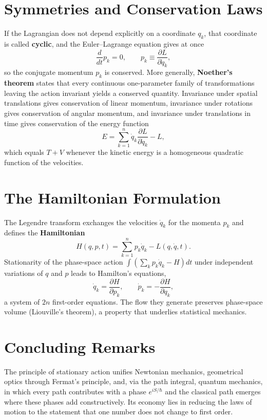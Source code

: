 \section{Symmetries and Conservation Laws}
If the Lagrangian does not depend explicitly on a coordinate $q_k$, that coordinate is called \textbf{cyclic}, and the Euler--Lagrange equation gives at once
\begin{equation}
    \frac{d}{dt} p_k = 0, \qquad p_k \equiv \frac{\partial L}{\partial \dot{q}_k},
\end{equation}
so the conjugate momentum $p_k$ is conserved. More generally, \textbf{Noether's theorem} states that every continuous one-parameter family of transformations leaving the action invariant yields a conserved quantity. Invariance under spatial translations gives conservation of linear momentum, invariance under rotations gives conservation of angular momentum, and invariance under translations in time gives conservation of the energy function
\begin{equation}
    E = \sum_{k=1}^{n} \dot{q}_k \frac{\partial L}{\partial \dot{q}_k} - L ,
\end{equation}
which equals $T + V$ whenever the kinetic energy is a homogeneous quadratic function of the velocities.

\section{The Hamiltonian Formulation}
The Legendre transform exchanges the velocities $\dot{q}_k$ for the momenta $p_k$ and defines the \textbf{Hamiltonian}
\begin{equation}
    H(q, p, t) = \sum_{k=1}^{n} p_k \dot{q}_k - L(q, \dot{q}, t).
\end{equation}
Stationarity of the phase-space action $\int \left( \sum_k p_k \dot{q}_k - H \right) dt$ under independent variations of $q$ and $p$ leads to Hamilton's equations,
\begin{equation}
    \dot{q}_k = \frac{\partial H}{\partial p_k}, \qquad \dot{p}_k = -\frac{\partial H}{\partial q_k},
\end{equation}
a system of $2n$ first-order equations. The flow they generate preserves phase-space volume (Liouville's theorem), a property that underlies statistical mechanics.

\section{Concluding Remarks}
The principle of stationary action unifies Newtonian mechanics, geometrical optics through Fermat's principle, and, via the path integral, quantum mechanics, in which every path contributes with a phase $e^{i S / \hbar}$ and the classical path emerges where these phases add constructively. Its economy lies in reducing the laws of motion to the statement that one number does not change to first order.


